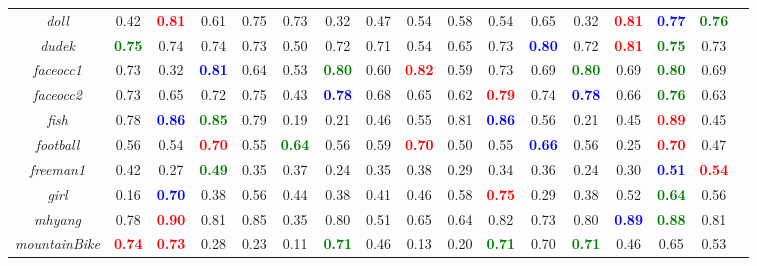 \documentclass[preprint,12pt,review]{elsarticle}
\begin{document}
\begin{table*}[htp]
{\begin{tabular}{|c|c|c|c|c|c|c|c|c|c|c|c|c|c|c|c|c|}
\emph{doll}   &0.42  &\textcolor{red}{\textbf{0.81}}  &0.61 &0.75 &0.73   &0.32  &0.47  &0.54  &0.58  &0.54 &0.65 &0.32  &\textcolor{red}{\textbf{0.81}}  &\textcolor{blue}{\textbf{0.77}} &\textcolor{green}{\textbf{0.76}} \\
\emph{dudek}   &\textcolor{green}{\textbf{0.75}}   &0.74  &0.74 &0.73  &0.50 &0.72 &0.71 &0.54 &0.65 &0.73 &\textcolor{blue}{\textbf{0.80}} &0.72 &\textcolor{red}{\textbf{0.81}} &\textcolor{green}{\textbf{0.75}}  &0.73 \\
\emph{faceocc1}   &0.73   &0.32  &\textcolor{blue}{\textbf{0.81}} &0.64  &0.53  &\textcolor{green}{\textbf{0.80}}  &0.60  &\textcolor{red}{\textbf{0.82}} &0.59 &0.73  &0.69 &\textcolor{green}{\textbf{0.80} } &0.69  &\textcolor{green}{\textbf{0.80}} &0.69\\
\emph{faceocc2}  &0.73   &0.65  &0.72 &0.75 &0.43 &\textcolor{blue}{\textbf{0.78}}   &0.68  &0.65  &0.62 &\textcolor{red}{\textbf{0.79}} &0.74  &\textcolor{blue}{\textbf{0.78}}  &0.66 &\textcolor{green}{\textbf{0.76}} &0.63 \\
\emph{fish}   &0.78  &\textcolor{blue}{\textbf{0.86}}  &\textcolor{green}{\textbf{0.85}} &0.79  &0.19 &0.21  &0.46  &0.55  &0.81 &\textcolor{blue}{\textbf{0.86}} &0.56  &0.21  &0.45  &\textcolor{red}{\textbf{0.89}} &0.45\\
\emph{football}   &0.56  &0.54  &\textcolor{red}{\textbf{0.70}}  &0.55  &\textcolor{green}{\textbf{0.64}}  &0.56  &0.59 &\textcolor{red}{\textbf{0.70}} &0.50  &0.55  &\textcolor{blue}{\textbf{0.66}} &0.56  &0.25  &\textcolor{red}{\textbf{0.70}} &0.47 \\
\emph{freeman1}   &0.42   &0.27 &\textcolor{green}{\textbf{0.49}} &0.35 &0.37 &0.24 &0.35 &0.38 &0.29 &0.34  &0.36 &0.24  &0.30  &\textcolor{blue}{\textbf{0.51}} &\textcolor{red}{\textbf{0.54}} \\
\emph{girl}    &0.16   &\textcolor{blue}{\textbf{0.70}}  &0.38  &0.56  &0.44 &0.38  &0.41  &0.46 &0.58  &\textcolor{red}{\textbf{0.75}} &0.29 &0.38  &0.52  &\textcolor{green}{\textbf{0.64}} &0.56\\
\emph{mhyang}   &0.78  &\textcolor{red}{\textbf{0.90}}  &0.81 &0.85  &0.35 &0.80 &0.51 &0.65 &0.64 &0.82 &0.73 &0.80 &\textcolor{blue}{\textbf{0.89}}&\textcolor{green}{\textbf{0.88}}  &0.81\\
\emph{mountainBike}   &\textcolor{red}{\textbf{0.74}}   &\textcolor{red}{\textbf{0.73}}  &0.28 &0.23  &0.11 &\textcolor{green}{\textbf{0.71}}  &0.46  &0.13  &0.20 &\textcolor{green}{\textbf{0.71}}  &0.70  &\textcolor{green}{\textbf{0.71}}  &0.46 &0.65 &0.53 \\

\end{tabular}}
\end{table*}
\end{document}
